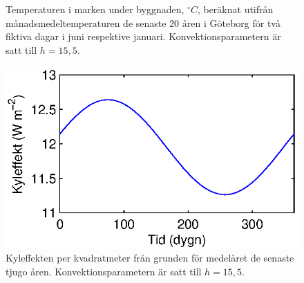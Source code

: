 \begin{figure}
\centering
{}
\caption{\label{fig:groundheat}
Temperaturen i marken under byggnaden, $\unit{^\circ C}$, beräknat utifrån månadsmedeltemperaturen de senaste 20 åren i Göteborg för två fiktiva dagar i juni respektive januari. Konvektionsparametern är satt till $h=15,5$. }
\end{figure}


\begin{figure}
\centering
\includegraphics{images/groundcool.eps}
\caption{\label{fig:cooling_ground}
Kyleffekten per kvadratmeter från grunden för medelåret de senaste tjugo åren. Konvektionsparametern är satt till $h=15,5$. }

\end{figure}




